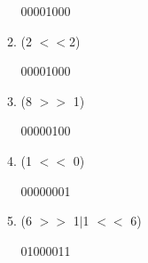 \documentclass[12pt,letterpaper]{article}
\begin{document}
\begin{enumerate}
\begin{enumerate}
		00001000
		
		\item 
		(2 $<<$2)
		
		00001000
		
		\item 
		(8 $>>$ 1)
		
		00000100
		
		\item 
		(1 $<<$ 0)
		
		00000001
		
		\item 
		(6 $>>$ 1$|$1 $<<$ 6)

		01000011
		
	\end{enumerate}
	
	
	
\end{enumerate}
\end{document}
